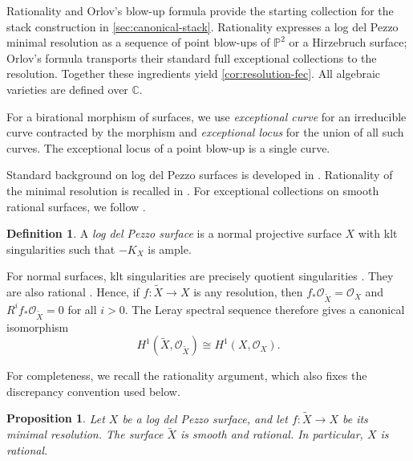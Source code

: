 \documentclass[11pt]{article}
\theoremstyle{plain}
\newtheorem{proposition}[proposition]{Proposition}
\theoremstyle{definition}
\newtheorem{definition}[definition]{Definition}
\theoremstyle{remark}
\newcommand{\Pp}{\mathbb P}
\newcommand{\C}{\mathbb C}
\newcommand{\OO}{\mathcal O}
\begin{document}
Rationality and Orlov's blow-up formula provide the starting collection
for the stack construction in \cref{sec:canonical-stack}. Rationality
expresses a log del Pezzo minimal resolution as a sequence of point
blow-ups of \(\Pp^2\) or a Hirzebruch surface; Orlov's formula transports
their standard full exceptional collections to the resolution. Together
these ingredients yield \cref{cor:resolution-fec}. All algebraic
varieties are defined over \(\C\).

For a birational morphism of surfaces, we use \emph{exceptional curve} for
an irreducible curve contracted by the morphism and \emph{exceptional locus}
for the union of all such curves. The exceptional locus of a point
blow-up is a single curve.

Standard background on log del Pezzo surfaces is developed in
\cite[section~\enquote{Basic facts about log del Pezzo surfaces}]{AlexeevNikulin}.
Rationality of the minimal resolution is recalled in
\cite[Remark~4.3]{GugiattiRota2023}. For exceptional collections on smooth rational surfaces,
we follow \cite{HillePerling2011}.

\begin{definition}
A \emph{log del Pezzo surface} is a normal projective surface \(X\) with klt singularities such that \(-K_X\) is ample.
\end{definition}

For normal surfaces, klt singularities are precisely quotient singularities \cite[Corollary 5.21]{Kollar1998}. They are also rational \cite[Theorem 5.22]{Kollar1998}. Hence, if \(f:\widetilde X\to X\) is any resolution, then \(f_*\OO_{\widetilde X}=\OO_X\) and \(R^i f_*\OO_{\widetilde X}=0\) for all \(i>0\). The Leray spectral sequence therefore gives a canonical isomorphism
\[
H^1(\widetilde X,\OO_{\widetilde X})
\cong
H^1(X,\OO_X).
\]

For completeness, we recall the rationality argument, which also fixes
the discrepancy convention used below.

\begin{proposition}\label{prop:log-del-pezzo-rational}
Let \(X\) be a log del Pezzo surface, and let \(f:\widetilde X\to X\) be its minimal resolution. The surface \(\widetilde X\) is smooth and rational. In particular, \(X\) is rational.
\end{proposition}
\end{document}
